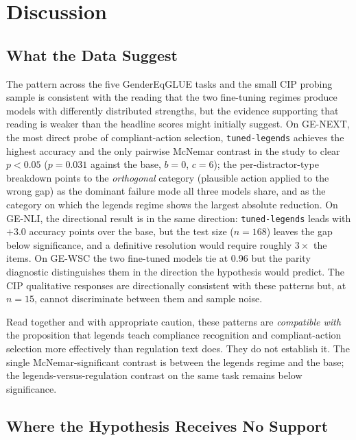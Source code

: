 \documentclass[pdflatex, sn-apa]{sn-jnl}%
\theoremstyle{thmstyleone}%
\theoremstyle{thmstyletwo}%
\theoremstyle{thmstylethree}%
\newcommand{\modellegends}{\texttt{tuned-legends}}
\begin{document}
\FloatBarrier

\section{Discussion}
\label{sec:discussion}

\subsection{What the Data Suggest}
\label{sec:disc:suggest}

The pattern across the five GenderEqGLUE tasks and the small CIP
probing sample is consistent with the reading that the two fine-tuning
regimes produce models with differently distributed strengths, but
the evidence supporting that reading is weaker than the headline scores
might initially suggest. On GE-NEXT, the most direct probe of
compliant-action selection, \modellegends{} achieves the highest
accuracy and the only pairwise McNemar contrast in the study to clear
$p<0.05$ ($p=0.031$ against the base, $b=0$, $c=6$); the
per-distractor-type breakdown points to the \emph{orthogonal} category
(plausible action applied to the wrong gap) as the dominant failure
mode all three models share, and as the category on which the legends
regime shows the largest absolute reduction. On GE-NLI, the directional
result is in the same direction: \modellegends{} leads with $+3.0$
accuracy points over the base, but the test size ($n=168$) leaves the
gap below significance, and a definitive resolution would require
roughly $3\times$ the items. On GE-WSC the two fine-tuned models tie at
0.96 but the parity diagnostic distinguishes them in the direction the
hypothesis would predict. The CIP qualitative responses are
directionally consistent with these patterns but, at $n=15$, cannot
discriminate between them and sample noise.

Read together and with appropriate caution, these patterns are
\emph{compatible with} the proposition that legends teach compliance
recognition and compliant-action selection more effectively than
regulation text does. They do not establish it. The single
McNemar-significant contrast is between the legends regime and the
base; the legends-versus-regulation contrast on the same task remains
below significance.

\subsection{Where the Hypothesis Receives No Support}
\label{sec:disc:notsupported}
\end{document}
